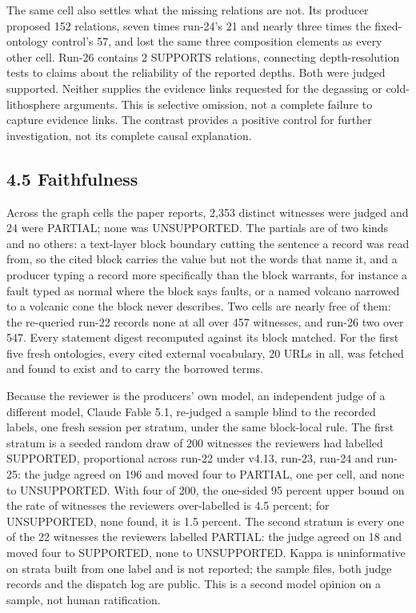 The same cell also settles what the missing relations are not. Its producer proposed 152 relations, seven times run-24's 21 and nearly three times the fixed-ontology control's 57, and lost the same three composition elements as every other cell. Run-26 contains 2 SUPPORTS relations, connecting depth-resolution tests to claims about the reliability of the reported depths. Both were judged supported. Neither supplies the evidence links requested for the degassing or cold-lithosphere arguments. This is selective omission, not a complete failure to capture evidence links. The contrast provides a positive control for further investigation, not its complete causal explanation.

\subsection*{4.5 Faithfulness}

Across the graph cells the paper reports, 2,353 distinct witnesses were judged and 24 were PARTIAL; none was UNSUPPORTED. The partials are of two kinds and no others: a text-layer block boundary cutting the sentence a record was read from, so the cited block carries the value but not the words that name it, and a producer typing a record more specifically than the block warrants, for instance a fault typed as normal where the block says faults, or a named volcano narrowed to a volcanic cone the block never describes. Two cells are nearly free of them: the re-queried run-22 records none at all over 457 witnesses, and run-26 two over 547. Every statement digest recomputed against its block matched. For the first five fresh ontologies, every cited external vocabulary, 20 URLs in all, was fetched and found to exist and to carry the borrowed terms.

Because the reviewer is the producers' own model, an independent judge of a different model, Claude Fable 5.1, re-judged a sample blind to the recorded labels, one fresh session per stratum, under the same block-local rule. The first stratum is a seeded random draw of 200 witnesses the reviewers had labelled SUPPORTED, proportional across run-22 under v4.13, run-23, run-24 and run-25: the judge agreed on 196 and moved four to PARTIAL, one per cell, and none to UNSUPPORTED. With four of 200, the one-sided 95 percent upper bound on the rate of witnesses the reviewers over-labelled is 4.5 percent; for UNSUPPORTED, none found, it is 1.5 percent. The second stratum is every one of the 22 witnesses the reviewers labelled PARTIAL: the judge agreed on 18 and moved four to SUPPORTED, none to UNSUPPORTED. Kappa is uninformative on strata built from one label and is not reported; the sample files, both judge records and the dispatch log are public. This is a second model opinion on a sample, not human ratification.

